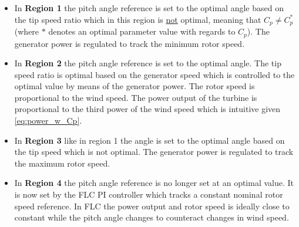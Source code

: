 \begin{itemize}
	\item In \textbf{Region 1} the pitch angle reference is set to the optimal angle based on the tip speed ratio which in this region is \underline{not} optimal, meaning that $ C_p \neq C_p^* $ (where $ * $ denotes an optimal parameter value with regards to $ C_p $). The generator power is regulated to track the minimum rotor speed.
	\item In \textbf{Region 2} the pitch angle reference is set to the optimal angle. The tip speed ratio is optimal based on the generator speed which is controlled to the optimal value by means of the generator power. The rotor speed is proportional to the wind speed. The power output of the turbine is proportional to the third power of the wind speed which is intuitive given \cref{eq:power_w_Cp}.
	\item In \textbf{Region 3} like in region 1 the angle is set to the optimal angle based on the tip speed which is not optimal. The generator power is regulated to track the maximum rotor speed.
	\item In \textbf{Region 4} the pitch angle reference is no longer set at an optimal value. It is now set by the FLC PI controller which tracks a constant nominal rotor speed reference. In FLC the power output and rotor speed is ideally close to constant while the pitch angle changes to counteract changes in wind speed.
\end{itemize}



